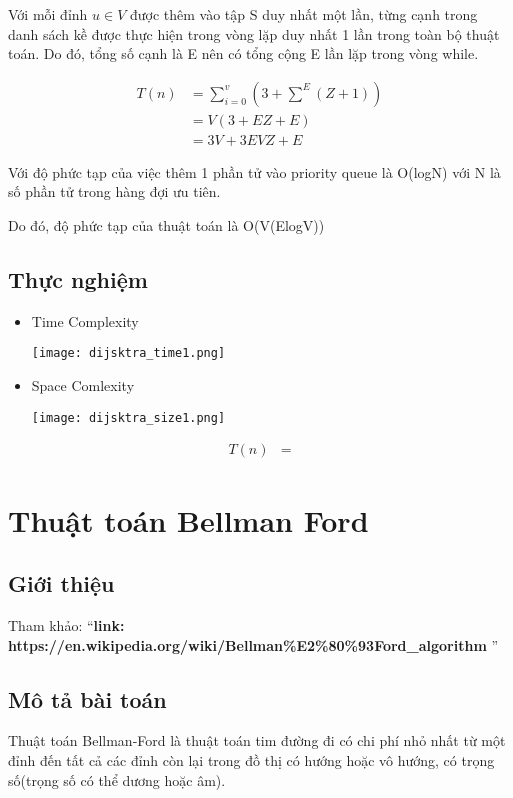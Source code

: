 \documentclass[a4paper]{article}
\begin{document}
Với mỗi đỉnh  $u\in V$ được thêm vào tập S duy nhất một lần, từng cạnh trong danh sách kề được thực hiện trong vòng lặp duy nhất 1 lần trong toàn bộ thuật toán. Do đó, tổng số cạnh là E nên có tổng cộng E lần lặp trong vòng while.

\begin{align*}
    T(n)&=\sum_{i=0}^{v}(3 + \sum_{}^{E}(Z + 1))\\
    &= V(3+EZ+E) \\
    &= 3V + 3EVZ + E
\end{align*}

Với độ phức tạp của việc thêm 1 phần tử vào priority queue là O(logN) với N là số phần tử trong hàng đợi ưu tiên.

Do đó, độ phức tạp của thuật toán là O(V(ElogV))

\subsection{Thực nghiệm}
\begin{itemize}
    \item Time Complexity
    \begin{center}
        \texttt{[image: dijsktra\_time1.png]}   
    \end{center}
    \item Space Comlexity
    \begin{center}
        \texttt{[image: dijsktra\_size1.png]}   
    \end{center}
\end{itemize}
\begin{align*}
    T(n)&=

\end{align*}


\section{Thuật toán Bellman Ford}
\subsection{Giới thiệu}
Tham khảo: ``\textbf{link: https://en.wikipedia.org/wiki/Bellman\%E2\%80\%93Ford\_algorithm
}''
\subsection{Mô tả bài toán}
Thuật toán Bellman-Ford là thuật toán tim đường đi có chi phí nhỏ nhất từ một đỉnh đến tất cả các đỉnh còn lại trong đồ thị  có hướng hoặc vô hướng, có trọng số(trọng số có thể dương hoặc âm).
\end{document}
